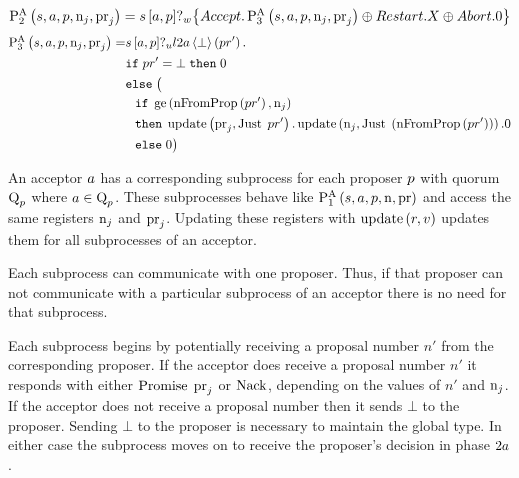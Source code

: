 \begin{align*}
\textstyle\operatorname{P^{A}_{2}}\left(
    s,
    a,
    p,
    \operatorname{n}_{j},
    \operatorname{pr}_{j}
\right) =
    s\left[a, p\right]?_w \big\{
    \mathnormal{Accept}.
        \textstyle\operatorname{P^{A}_{3}}\left(
            s,
            a,
            p,
            \operatorname{n}_{j},
            \operatorname{pr}_{j}
        \right)
    \oplus \mathnormal{Restart}.X
    \oplus \mathnormal{Abort}.0
\big\}
\end{align*}
\begin{align*}
\textstyle\operatorname{P^{A}_{3}}\left(
    s,
    a,
    p,
    \operatorname{n}_{j},
    \operatorname{pr}_{j}
\right) =
&
    s\left[a, p\right]?_u l2a \left\langle \bot \right\rangle \left(pr'\right).\\
&
    \mathtt{if}\; pr' = \bot \;\mathtt{then}\; 0\\
&
    \mathtt{else}\;
\big(
    \\
&\hspace*{0.75em * 1}
    \mathtt{if}\; \operatorname{ge}\left(\operatorname{nFromProp}\left(pr' \right), \operatorname{n}_{j}\right)\\
&\hspace*{0.75em * 1}
    \mathtt{then}\;
        \operatorname{update} \left(\operatorname{pr}_{j}, \operatorname{Just}\; pr'\right).
        \operatorname{update} \left(\operatorname{n}_{j}, \operatorname{Just}\; \left(\operatorname{nFromProp}\left(pr' \right)\right)\right).
        0\\
&\hspace*{0.75em * 1}
    \mathtt{else}\; 0
\big)
\end{align*}

An acceptor $a$ has a corresponding subprocess for each proposer $p$ with quorum $\operatorname{Q}_{p}$ where $a\in\operatorname{Q}_{p}$.
These subprocesses behave like $\textstyle\operatorname{P^{A}_{1}}\left(
    s,
    a,
    p,
    \operatorname{n},
    \operatorname{pr}
\right)$ and access the same registers $\operatorname{n}_{j}$ and $\operatorname{pr}_{j}$.
Updating these registers with $\operatorname{update} \left(r, v\right)$ updates them for all subprocesses of an acceptor.

Each subprocess can communicate with one proposer.
Thus, if that proposer can not communicate with a particular subprocess of an acceptor there is no need for that subprocess.

Each subprocess begins by potentially receiving a proposal number $n'$ from the corresponding proposer.
If the acceptor does receive a proposal number $n'$ it responds with either $\operatorname{Promise}\; \operatorname{pr}_{j}$ or $\operatorname{Nack}$, depending on the values of $n'$ and $\operatorname{n}_{j}$.
If the acceptor does not receive a proposal number then it sends $\bot$ to the proposer.
Sending $\bot$ to the proposer is necessary to maintain the global type.
In either case the subprocess moves on to receive the proposer's decision in phase $2a$.

